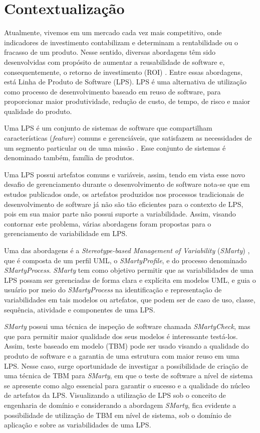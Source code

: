 \chapter{Contextualização}
\pagestyle{plain}


Atualmente, vivemos em um mercado cada vez mais competitivo, onde indicadores de investimento contabilizam e determinam a rentabilidade ou o fracasso de um produto. Nesse sentido, diversas abordagens têm sido desenvolvidas com propósito de aumentar a reusabilidade de software e, consequentemente, o retorno de investimento (ROI) \cite{delamaro2017introduccao}. Entre essas abordagens, está Linha de Produto de Software (LPS). LPS é uma alternativa de utilização como processo de desenvolvimento baseado em reuso de software, para proporcionar maior produtividade, redução de custo, de tempo, de risco e maior qualidade do produto.

Uma LPS é um conjunto de sistemas de software que compartilham características (\textit{feature}) comuns e gerenciáveis, que satisfazem as necessidades de um segmento particular ou de uma missão \cite{clements2002software}. Esse conjunto de sistemas é denominado também, família de produtos.

Uma LPS possui artefatos comuns e variáveis, assim, tendo em vista esse novo desafio de gerenciamento durante o desenvolvimento de software nota-se que em estudos publicados onde, os artefatos produzidos nos processos tradicionais de desenvolvimento de software já não são tão eficientes para o contexto de LPS, pois em sua maior parte não possui suporte a variabilidade. Assim, visando contornar este problema, várias abordagens foram propostas para o gerenciamento de variabilidade em LPS.

Uma das abordagens é a \textit{Stereotype-based Management of Variability} (\textit{SMarty}) \cite{junior2010systematic} , que é composta de um perfil UML, o \textit{SMartyProfile}, e do processo denominado \textit{SMartyProcess}. \textit{SMarty} tem como objetivo permitir que as variabilidades de uma LPS possam ser gerenciadas de forma clara e explícita em modelos UML, e guia o usuário por meio do \textit{SMartyProcess} na identificação e representação de variabilidades em tais modelos ou artefatos, que podem ser de caso de uso, classe, sequência, atividade e componentes de uma LPS.

\textit{SMarty} possui uma técnica de inspeção de software chamada \textit{SMartyCheck}, mas que para permitir maior qualidade dos seus modelos é interessante testá-los. Assim, teste baseado em modelo (TBM) pode ser usado visando a qualidade do produto de software e a garantia de uma estrutura com maior reuso em uma LPS. Nesse caso, surge oportunidade de investigar a possibilidade de criação de uma técnica de TBM para \textit{SMarty}, em que o teste de software a nível de sistema se apresente como algo essencial para garantir o sucesso e a qualidade do núcleo de artefatos da LPS. Visualizando a utilização de LPS sob o conceito de engenharia de domínio e considerando a abordagem \textit{SMarty}, fica evidente a possibilidade de utilização de TBM em nível de sistema, sob o domínio de aplicação e sobre as variabilidades de uma LPS.

